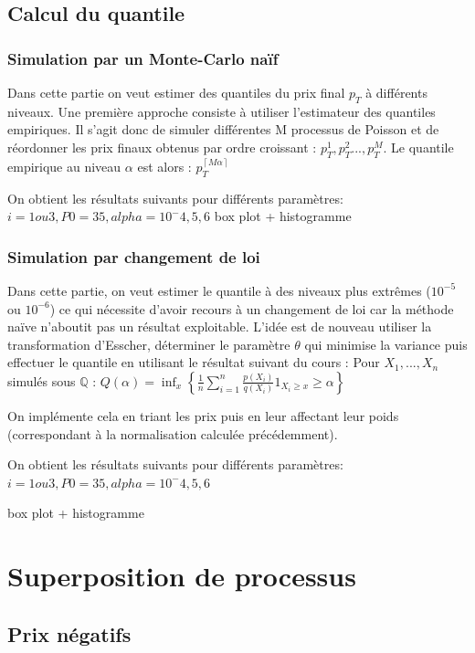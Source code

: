 \documentclass[a4paper,11pt]{article}
\begin{document}
\subsection{Calcul du quantile}

\subsubsection{Simulation par un Monte-Carlo naïf}
Dans cette partie on veut estimer des quantiles du prix final $p_{T}$ à différents niveaux. Une première approche consiste à utiliser l'estimateur des quantiles empiriques. Il s'agit donc de simuler différentes M processus de Poisson et de réordonner les prix finaux obtenus par ordre croissant : $p_{T}^{1}, p_{T}^{2}..., p_{T}^{M}$. Le quantile empirique au niveau $\alpha$ est alors : $p_{T}^{\left \lceil M\alpha  \right \rceil}$

On obtient les résultats suivants pour différents paramètres:
$i=1 ou 3, P0=35, alpha=10^-4, 5, 6$
box plot + histogramme

\subsubsection{Simulation par changement de loi}
Dans cette partie, on veut estimer le quantile à des niveaux plus extrêmes ($10^{-5}$ ou $10^{-6}$) ce qui nécessite d'avoir recours à un changement de loi car la méthode naïve n'aboutit pas un résultat exploitable. L'idée est de nouveau utiliser la transformation d'Esscher, déterminer le paramètre $\theta$ qui minimise la variance puis effectuer le quantile en utilisant le résultat suivant du cours :
Pour $X_{1},...,X_{n}$ simulés sous $\mathbb{Q}$ : 
$Q(\alpha)=\inf_{x} \left \{ \frac{1}{n}\sum_{i=1}^{n} \frac{p(X_{i})}{q(X_{i})}1_{X_{i}\geq x}\geq \alpha \right \}$

On implémente cela en triant les prix puis en leur affectant leur poids (correspondant à la normalisation calculée précédemment).

On obtient les résultats suivants pour différents paramètres:
$i=1 ou 3, P0=35, alpha=10^-4, 5, 6$

box plot + histogramme


\section{Superposition de processus}

\subsection{Prix négatifs}
\end{document}
